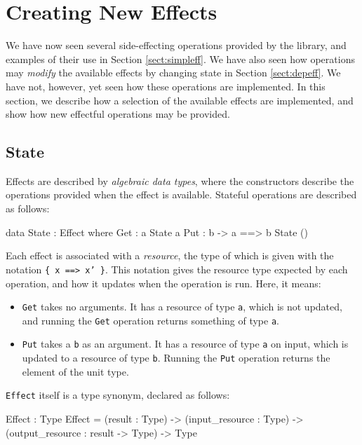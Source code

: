 \section{Creating New Effects}

\label{sect:impleff}

We have now seen several side-effecting operations provided by the \effects{}
library, and examples of their use in Section \ref{sect:simpleff}. We have also
seen how operations may \emph{modify} the available effects by changing
state in Section \ref{sect:depeff}. We have not, however, yet seen how 
these operations are implemented. In this section, we describe how a selection
of the available effects are implemented, and show how new effectful operations
may be provided.

\subsection{State}

Effects are described by \emph{algebraic data types}, where the constructors
describe the operations provided when the effect is available. Stateful
operations are described as follows:

\begin{code}
data State : Effect where
     Get :      { a }       State a
     Put : b -> { a ==> b } State () 
\end{code}

\noindent
Each effect is associated with a \emph{resource}, the type of which is given
with the notation 
\texttt{\{ x ==> x' \}}. This notation gives the resource type expected by
each operation, and how it updates when the operation is run. Here, it means:

\begin{itemize}
\item \texttt{Get} takes no arguments. It has a resource of type \texttt{a},
which is not updated, and running the \texttt{Get} operation returns something
of type \texttt{a}.
\item \texttt{Put} takes a \texttt{b} as an argument. It has a resource of type
\texttt{a} on input, which is updated to a resource of type \texttt{b}.
Running the \texttt{Put} operation returns the element of the unit type.
\end{itemize}

\noindent
\texttt{Effect} itself is a type synonym, declared as follows:

\begin{code}
Effect : Type
Effect = (result : Type) -> 
         (input_resource : Type) -> 
         (output_resource : result -> Type) -> Type
\end{code}

